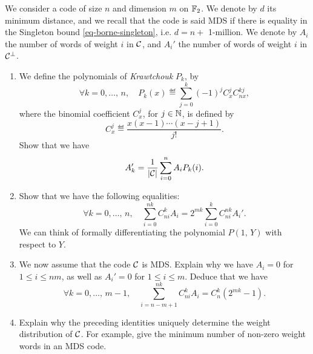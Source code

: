  
\begin{exo}
\label{exo-polynomials-mds}
 
   We consider a code of size $ n $ and dimension $ m $ on $ \mathbb{F}_2 $. We denote by $ d $ its minimum distance, and we recall that the code is said MDS if there is equality in the Singleton bound \eqref{eq-borne-singleton}, i.e. $ d = n + $ 1-million. We denote by $ A_i $ the number of words of weight $ i $ in $ \mathcal{C} $, and $ A_i'$ the number of words of weight $ i $ in $ \mathcal{C}^\bot $. \begin{enumerate}
\item {}  We define the polynomials of \textit{Krawtchouk} $ P_k $, by
\begin{equation}
\label{eq-defn-poly-krawtchouk}
\forall k = 0, \ldots, \, n, \quad P_k (x) \eqdef \sum_{j = 0}^{k}{(-1)^j C_x^j C_{nx}^{kj} },
\end{equation}
where the binomial coefficient $ C_x^j $, for $ j \in \mathbb{N} $, is defined by
\begin{equation*}
C_x^j \eqdef \frac{x (x-1) \cdots (x-j + 1)}{j!}.
\end{equation*}
Show that we have
\begin{equation*}
A_k'= \frac{1}{| \mathcal{C} |} \sum_{i = 0}^n{A_i P_k (i)}.
\end{equation*}
 
\item Show that we have the following equalities:
\begin{equation*}
\forall k = 0, \ldots, \, n, \quad \sum_{i = 0}^{nk}{C_{ni}^k A_i} = 2^{mk} \sum_{i = 0}^k{C_{ni}^{nk} A_i'}.
\end{equation*}
We can think of formally differentiating the polynomial $ P (1, \, Y) $ with respect to $ Y $.
\item We now assume that the code $ \mathcal{C} $ is MDS. Explain why we have $ A_i = 0 $ for $ 1 \leq i \leq nm $, as well as $ A_i'= 0 $ for $ 1 \leq i \leq m $. Deduce that we have
\begin{equation*}
\forall k = 0, \ldots, \, m-1, \quad \sum_{i = n-m + 1}^{nk}{C_{ni}^k A_i} = C_n^k (2^{mk } -1).
\end{equation*}
 
\item Explain why the preceding identities uniquely determine the weight distribution of $ \mathcal{C} $. For example, give the minimum number of non-zero weight words in an MDS code.
\end{enumerate}
\end{exo}
 
